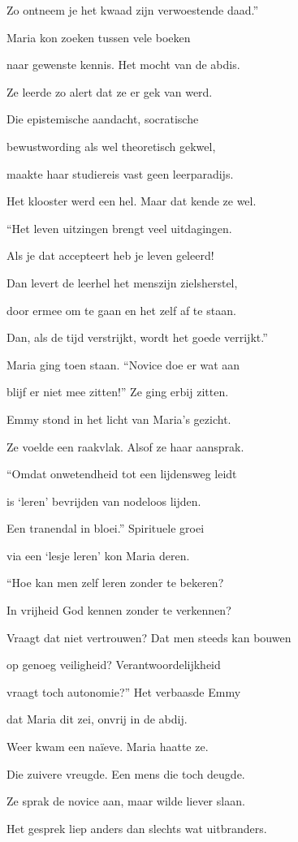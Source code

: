 Zo ontneem je het kwaad
zijn verwoestende daad.”

Maria kon zoeken
tussen vele boeken

naar gewenste kennis.
Het mocht van de abdis.

Ze leerde zo alert
dat ze er gek van werd.

Die epistemische
aandacht, socratische

bewustwording als wel
theoretisch gekwel,

maakte haar studiereis
vast geen leerparadijs.

Het klooster werd een hel.
Maar dat kende ze wel.

“Het leven uitzingen
brengt veel uitdagingen.

Als je dat accepteert
heb je leven geleerd!

Dan levert de leerhel
het menszijn zielsherstel,

door ermee om te gaan
en het zelf af te staan.

Dan, als de tijd verstrijkt,
wordt het goede verrijkt.”

Maria ging toen staan.
“Novice doe er wat aan

blijf er niet mee zitten!”
Ze ging erbij zitten.

Emmy stond in het licht
van Maria’s gezicht.

Ze voelde een raakvlak.
Alsof ze haar aansprak.

“Omdat onwetendheid
tot een lijdensweg leidt

is ‘leren’ bevrijden
van nodeloos lijden.

Een tranendal in bloei.”
Spirituele groei

via een ‘lesje leren’
kon Maria deren.

“Hoe kan men zelf leren
zonder te bekeren?

In vrijheid God kennen
zonder te verkennen?

Vraagt dat niet vertrouwen?
Dat men steeds kan bouwen

op genoeg veiligheid?
Verantwoordelijkheid

vraagt toch autonomie?”
Het verbaasde Emmy

dat Maria dit zei,
onvrij in de abdij.

Weer kwam een naïeve.
Maria haatte ze.

Die zuivere vreugde.
Een mens die toch deugde.

Ze sprak de novice aan,
maar wilde liever slaan.

Het gesprek liep anders
dan slechts wat uitbranders.


